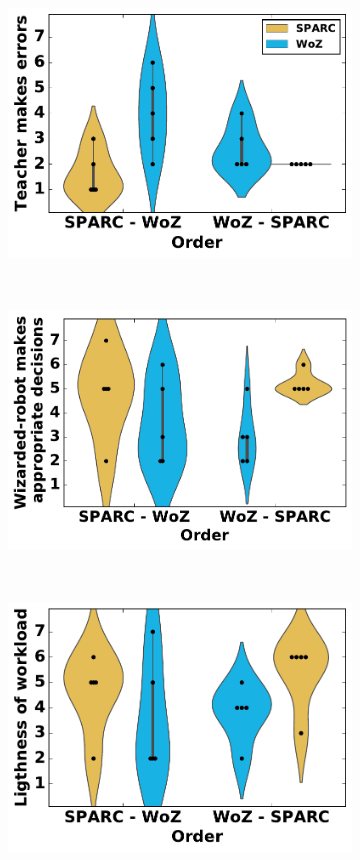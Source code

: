 \begin{figure}[ht]
	\centering
	\begin{subfigure}[t]{0.3295\textwidth}
		\centering
		\includegraphics[width=1.\textwidth]{errors.pdf}
	\end{subfigure}%
	~ 
	\begin{subfigure}[t]{0.341\textwidth}
		\centering
		\includegraphics[width=1.\textwidth]{appropriate.pdf}
	\end{subfigure}%
	~ 
	\begin{subfigure}[t]{0.3295\textwidth}
		\centering
		\includegraphics[width=1.\textwidth]{workload.pdf}

\end{subfigure}
\end{figure}
